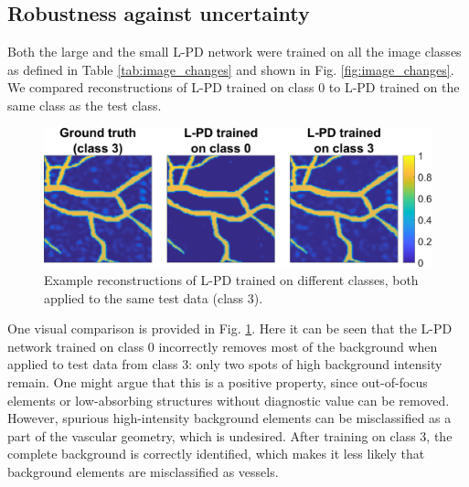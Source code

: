 \documentclass[journal]{IEEEtran}
\begin{document}
\subsection{Robustness against uncertainty}\label{sec:results_robustness}
Both the large and the small L-PD network were trained on all the image classes as defined in Table \ref{tab:image_changes} and shown in Fig. \ref{fig:image_changes}. We compared reconstructions of L-PD trained on class 0 to L-PD trained on the same class as the test class. 

\begin{figure}[ht!]
\centering
\includegraphics[width=\linewidth]{images/image_changes_im.png}
\caption{Example reconstructions of L-PD trained on different classes, both applied to the same test data (class 3).}
\label{fig:image_changes_result}
\vspace{-3mm}
\end{figure}

One visual comparison is provided in Fig. \ref{fig:image_changes_result}. Here it can be seen that the L-PD network trained on class 0 incorrectly removes most of the background when applied to test data from class 3: only two spots of high background intensity remain. One might argue that this is a positive property, since out-of-focus elements or low-absorbing structures without diagnostic value can be removed. However, spurious high-intensity background elements can be misclassified as a part of the vascular geometry, which is undesired. After training on class 3, the complete background is correctly identified, which makes it less likely that background elements are misclassified as vessels. 
\end{document}
